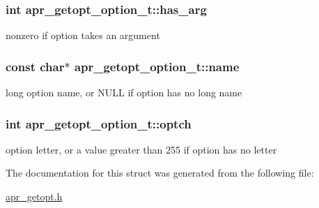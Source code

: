 \subsubsection[{\texorpdfstring{has\+\_\+arg}{has_arg}}]{\setlength{\rightskip}{0pt plus 5cm}int apr\+\_\+getopt\+\_\+option\+\_\+t\+::has\+\_\+arg}\hypertarget{structapr__getopt__option__t_aac65dae93f6d35f4848b91f6f9d66278}{}\label{structapr__getopt__option__t_aac65dae93f6d35f4848b91f6f9d66278}
nonzero if option takes an argument 
\subsubsection[{\texorpdfstring{name}{name}}]{\setlength{\rightskip}{0pt plus 5cm}const char$\ast$ apr\+\_\+getopt\+\_\+option\+\_\+t\+::name}\hypertarget{structapr__getopt__option__t_a7e623913c9761495c5d37adf6ff1ee69}{}\label{structapr__getopt__option__t_a7e623913c9761495c5d37adf6ff1ee69}
long option name, or N\+U\+LL if option has no long name 
\subsubsection[{\texorpdfstring{optch}{optch}}]{\setlength{\rightskip}{0pt plus 5cm}int apr\+\_\+getopt\+\_\+option\+\_\+t\+::optch}\hypertarget{structapr__getopt__option__t_a476e67c4dde620fe5b4f5952238c6e94}{}\label{structapr__getopt__option__t_a476e67c4dde620fe5b4f5952238c6e94}
option letter, or a value greater than 255 if option has no letter 

The documentation for this struct was generated from the following file\+:\begin{DoxyCompactItemize}
\item 
\hyperlink{apr__getopt_8h}{apr\+\_\+getopt.\+h}\end{DoxyCompactItemize}
